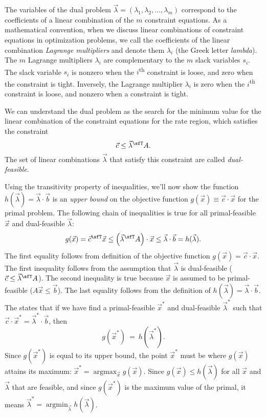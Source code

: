 \documentclass[11pt,oneside]{article}
\begin{document}
			
			The variables of the dual problem $\vec{\lambda}=(\lambda_1, \lambda_2, \ldots, \lambda_m)$ 
			correspond to the coefficients of a linear combination of the $m$ constraint equations.
			As a mathematical convention, 
			when we discuss linear combinations of constraint equations in optimization problems,
			we call the coefficients of the linear combination \emph{Lagrange multipliers} and denote them $\lambda_i$ (the Greek letter \emph{lambda}).
			The $m$ Lagrange multipliers $\lambda_i$ are complementary to the $m$ slack variables $s_i$.
			The slack variable $s_i$ is nonzero when the $i$\textsuperscript{th} constraint is loose,
			and zero when the constraint is tight.
			Inversely, the Lagrange multiplier $\lambda_i$ is zero when the $i$\textsuperscript{th} constraint is loose,
			and nonzero when a constraint is tight.

			We can understand the dual problem as the search for the minimum value
			for the linear combination of the constraint equations for the rate region,
			which satisfies the constraint
			\[	
				\vec{c} \leq \vec{\lambda}^\sfT A.
			\]
			The set of linear combinations $\vec{\lambda}$ that satisfy this constraint are called \emph{dual-feasible}.
			
			Using the transitivity property of inequalities,
			we'll now show the function $h(\vec{\lambda}) = \vec{\lambda} \cdot \vec{b}$
			is an \emph{upper bound} on the objective function $g(\vec{x}) \equiv \vec{c} \cdot \vec{x}$ for the primal problem.
			The following chain of inequalities is true for all primal-feasible $\vec{x}$ and dual-feasible $\vec{\lambda}$:
			\[
				g(\vec{x}) 
					= 	\vec{c}^\sfT \vec{x} 
					\leq 	\left(\vec{\lambda}^\sfT A\right) \cdot \vec{x} 
					\leq 	\vec{\lambda} \cdot \vec{b}  
					= 	h(\vec{\lambda}).
			\]
			The first equality follows from definition of the objective function $g(\vec{x}) = \vec{c} \cdot \vec{x}$.
			The first inequality follows from the assumption that $\vec{\lambda}$ is dual-feasible ($\vec{c} \leq \vec{\lambda}^\sfT A$).
			The second inequality is true because $\vec{x}$ is assumed to be primal-feasible ($A\vec{x}\leq\vec{b}$).
			The last equality follows from the definition of $h(\vec{\lambda}) = \vec{\lambda} \cdot \vec{b}$.
			The  states that if we have find 
			a primal-feasible $\vec{x}^*$ and dual-feasible $\vec{\lambda}^*$ such that 
			 $\vec{c} \cdot \vec{x}^* = \vec{\lambda}^* \cdot \vec{b}$,
			 then 
			 \[
			 	g(\vec{x}^*) \ = \ h(\vec{\lambda}^*).
			 \]
			 Since $g(\vec{x}^*)$ is equal to its upper bound,
			 the point $\vec{x}^*$ must be where $g(\vec{x})$ attains its maximum: 
			 $\displaystyle \vec{x}^* = \mathop{\textrm{argmax}}_{\vec{x}} g(\vec{x})$.
			 Since $g(\vec{x}) \leq h(\vec{\lambda})$ for all $\vec{x}$ and $\vec{\lambda}$ that are feasible,
			 and since $g(\vec{x}^*)$ is the maximum value of the primal,
			 it means $\displaystyle \vec{\lambda}^* = \mathop{\textrm{argmin}}_{\vec{\lambda}} h(\vec{\lambda})$.
\end{document}
